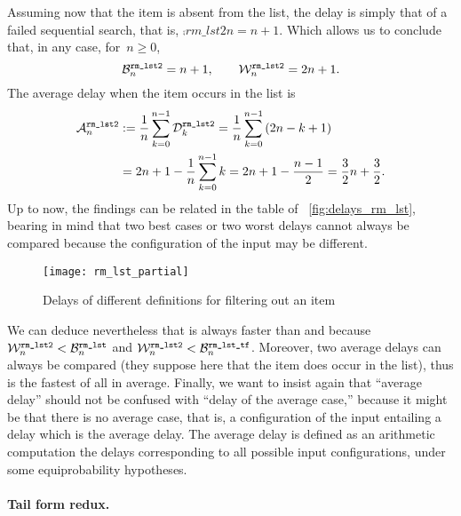 Assuming now that the item is absent from the list, the delay is
simply that of a failed sequential search, that is,
\(\comp{rm\_lst2}{n} = n + 1\). Which allows us to conclude that, in
any case, for~\(n \geqslant 0\),
\[
\best{rm\_lst2}{n} = n+1,\qquad \worst{rm\_lst2}{n} = 2n + 1.
\]
The average delay when the item occurs in the list is
\begin{align*}
\ave{rm\_lst2}{n}
  &:= \frac{1}{n}\sum_{k=0}^{n-1}{\comp{rm\_lst2}{k}}
   = \frac{1}{n}\sum_{k=0}^{n-1}{(2n - k + 1)}\\
  &= 2n + 1 - \frac{1}{n}\sum_{k=0}^{n-1}{k}
   = 2n + 1 - \frac{n-1}{2} = \frac{3}{2}{n} + \frac{3}{2}.
\end{align*}
Up to now, the findings can be related in the table of
\fig~\vref{fig:delays_rm_lst}, bearing in mind that two best cases or
two worst delays cannot always be compared because the configuration
of the input may be different.
\begin{figure}[b]
\centering
\texttt{[image: rm\_lst\_partial]}
\caption{Delays of different definitions for filtering out an item
\label{fig:delays_rm_lst}}
\end{figure}
We can deduce nevertheless that  is always faster
than  and  because
\(\worst{rm\_lst2}{n} < \best{rm\_lst}{n}\) and \(\worst{rm\_lst2}{n}
< \best{rm\_lst\_tf}{n}\). Moreover, two average delays can always be
compared (they suppose here that the item does occur in the list),
thus  is the fastest of all in average. Finally,
we want to insist again that ``average delay'' should not be confused
with ``delay of the average case,'' because it might be that there is no
average case, that is, a configuration of the input entailing a delay
which is the average delay. The average delay is defined as an
arithmetic computation the delays corresponding to all possible input
configurations, under some equi\-probability hypotheses.

\medskip

\paragraph{Tail form redux.}


